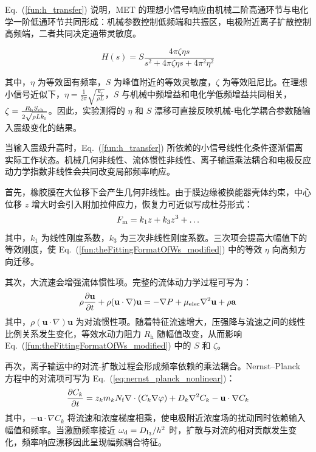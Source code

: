 \documentclass[sn-nature]{sn-jnl}
\newcommand{\fn}{\eta} %
\newcommand{\Sen}{S} %
\newcommand{\kr}{k_{\text{r}}} %
\begin{document}
Eq.~(\ref{fun:h_transfer}) 说明，MET 的理想小信号响应由机械二阶高通环节与电化学一阶低通环节共同形成：机械参数控制低频端和共振区，电极附近离子扩散控制高频端，二者共同决定通带灵敏度。

\begin{equation}
    H(s) = \Sen \frac{4\pi \zeta \fn s}{s^2 + 4\pi \zeta \fn s + 4\pi^2 \fn^2}
    \label{fun:theFittingFormatOfWs_modified}
\end{equation}

其中，$\fn$ 为等效固有频率，$\Sen$ 为峰值附近的等效灵敏度，$\zeta$ 为等效阻尼比。在理想小信号近似下，$\fn = \frac{1}{2\pi} \sqrt{\frac{\kr}{\rho L}}$，$\Sen$ 与机械中频增益和电化学低频增益共同相关，$\zeta = \frac{R_{\text{h}} S_{\rm ch}}{2 \sqrt{\rho L \kr}}$。因此，实验测得的 $\fn$ 和 $\Sen$ 漂移可直接反映机械-电化学耦合参数随输入震级变化的结果。

当输入震级升高时，Eq.~(\ref{fun:h_transfer}) 所依赖的小信号线性化条件逐渐偏离实际工作状态。机械几何非线性、流体惯性非线性、离子输运乘法耦合和电极反应动力学指数非线性会共同改变局部频率响应。

首先，橡胶膜在大位移下会产生几何非线性。由于膜边缘被换能器壳体约束，中心位移 $z$ 增大时会引入附加拉伸应力，恢复力可近似写成杜芬形式：
\begin{equation}
    F_{\rm m} = k_1 z + k_3 z^3 + \dots
    \label{eq:duffing_nonlinear}
\end{equation}
其中，$k_1$ 为线性刚度系数，$k_3$ 为三次非线性刚度系数。三次项会提高大幅值下的等效刚度，使 Eq.~(\ref{fun:theFittingFormatOfWs_modified}) 中的等效 $\fn$ 向高频方向迁移。

其次，大流速会增强流体惯性项。完整的流体动力学过程可写为：
\begin{equation}
    \rho \frac{\partial \mathbf{u}}{\partial t}
    + \rho(\mathbf{u}\cdot\nabla)\mathbf{u}
    = -\nabla P + \mu_{\rm elec}\nabla^2\mathbf{u} + \rho\mathbf{a}
    \label{eq:navier_stokes_full}
\end{equation}
其中，$\rho(\mathbf{u}\cdot\nabla)\mathbf{u}$ 为对流惯性项。随着特征流速增大，压强降与流速之间的线性比例关系发生变化，等效水动力阻力 $R_{\text{h}}$ 随幅值改变，从而影响 Eq.~(\ref{fun:theFittingFormatOfWs_modified}) 中的 $\Sen$ 和 $\zeta$。

再次，离子输运中的对流-扩散过程会形成频率依赖的乘法耦合。Nernst--Planck 方程中的对流项可写为 Eq.~(\ref{eq:nernst_planck_nonlinear})：
\begin{equation}
    \frac{\partial C_k}{\partial t} =
    z_k m_k N_{\rm f}\nabla\cdot(C_k\nabla\varphi)
    + D_k\nabla^2 C_k
    - \mathbf{u}\cdot\nabla C_k
    \label{eq:nernst_planck_nonlinear}
\end{equation}
其中，$-\mathbf{u}\cdot\nabla C_k$ 将流速和浓度梯度相乘，使电极附近浓度场的扰动同时依赖输入幅值和频率。当激励频率接近 $\omega_{\rm d}=D_{\mathrm{I}_3}/h^2$ 时，扩散与对流的相对贡献发生变化，频率响应漂移因此呈现幅频耦合特征。
\end{document}
